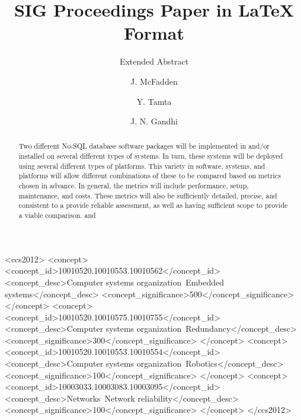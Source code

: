 \documentclass[sigconf]{acmart}
\begin{document}
\title{SIG Proceedings Paper in LaTeX Format}
\subtitle{Extended Abstract}


\author{J. McFadden}
\authornote{}
\orcid{}

\author{Y. Tamta}
\authornote{}
\orcid{}

\author{J. N. Gandhi}
\authornote{}
\orcid{}



\renewcommand{\shortauthors}{J. McFadden, Y. Tamta, J. N. Gandhi, et al}


\begin{abstract}
Two different No-SQL database software packages will be implemented in and/or installed on several different types of  systems.  In turn, these systems will be deployed using several different types of platforms. This variety in software, systems, and platforms will allow different combinations of these to be compared based on metrics chosen in advance.  In general, the metrics will include performance, setup, maintenance, and costs.  These metrics will also be sufficiently detailed, precise, and consistent to a provide reliable assessment, as well as having sufficient scope to provide a viable comparison.
and   
\end{abstract}

%
%
\begin{CCSXML}
<ccs2012>
 <concept>
  <concept_id>10010520.10010553.10010562</concept_id>
  <concept_desc>Computer systems organization~Embedded systems</concept_desc>
  <concept_significance>500</concept_significance>
 </concept>
 <concept>
  <concept_id>10010520.10010575.10010755</concept_id>
  <concept_desc>Computer systems organization~Redundancy</concept_desc>
  <concept_significance>300</concept_significance>
 </concept>
 <concept>
  <concept_id>10010520.10010553.10010554</concept_id>
  <concept_desc>Computer systems organization~Robotics</concept_desc>
  <concept_significance>100</concept_significance>
 </concept>
 <concept>
  <concept_id>10003033.10003083.10003095</concept_id>
  <concept_desc>Networks~Network reliability</concept_desc>
  <concept_significance>100</concept_significance>
 </concept>
</ccs2012>  
\end{CCSXML}
\end{document}
